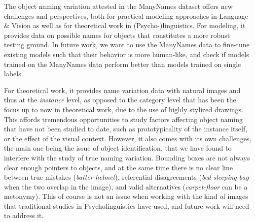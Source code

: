The object naming variation attested in the ManyNames dataset offers new challenges and perspectives, both for practical modeling approaches in Language \& Vision as well as for theoretical work in (Psycho-)linguistics.
For modeling, it provides data on possible names for objects that constitutes a more robust testing ground.
In future work, we want to use the ManyNames data to fine-tune existing models such that their behavior is more human-like, and check if models trained on the ManyNames data perform better than models trained on single labels. 

For theoretical work, it provides name variation data with natural images and thus at the \textit{instance} level, as opposed to the category level that has been the focus up to now in theoretical work, due to the use of highly stylized drawings.
This affords tremendous opportunities to study factors affecting object naming that have not been studied to date, such as prototypicality of the instance itself, or the effect of the visual context.
However, it also comes with its own challenges, the main one being the issue of object identification, that we have found to interfere with the study of true naming variation.
Bounding boxes are not always clear enough pointers to objects, and at the same time there is no clear line between true mistakes (\textit{batter-helmet}), referential disagreements (\textit{bed-sleeping bag} when the two overlap in the image), and valid alternatives (\textit{carpet-floor} can be a metonymy).
This of course is not an issue when working with the kind of images that traditional studies in Psycholinguistics have used, and future work will need to address it.

